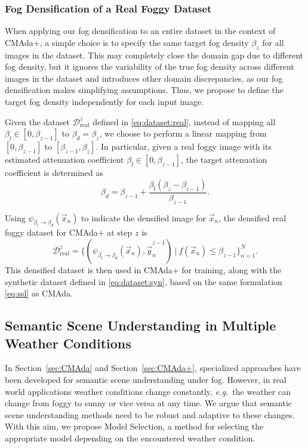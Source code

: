 \documentclass[twocolumn]{svjour3}          \smartqed  \usepackage{graphicx}
\newcommand{\eg}{\mbox{\emph{e.g.\ }}}
\begin{document}
\subsubsection{Fog Densification of a Real Foggy Dataset}
\label{sec:fog:densification:dataset}
When applying our fog densification to an entire dataset in the context of CMAda+, a simple choice is to specify the same target fog density $\beta_z$ for all images in the dataset. This may completely close the domain gap due to different fog density, but it ignores the variability of the true fog density across different images in the dataset and introduces other domain discrepancies, as our fog densification makes simplifying assumptions. Thus, we propose to define the target fog density independently for each input image.

Given the dataset $\mathcal{D}_{\text{real}}^z$ defined in \eqref{eq:dataset:real}, instead of mapping all $\beta_l \in [0, \beta_{z-1}]$ to $\beta_d = \beta_z$, we choose to perform a linear mapping from $[0, \beta_{z-1}]$  to $[\beta_{z-1}, \beta_{z}]$. In particular, given a real foggy image with its estimated attenuation coefficient $\beta_l \in [0, \beta_{z-1}]$, the target attenuation coefficient is determined as 
\begin{equation}
    \beta_d=\beta_{z-1}+\frac{\beta_l (\beta_z-\beta_{z-1})}{\beta_{z-1}}.
\end{equation}

Using $\psi_{\beta_l \rightarrow \beta_d}(\vec{x}_n)$ to indicate the densified image for $\vec{x}_n$, the densified real foggy dataset for CMAda+ at step $z$ is 
\begin{equation}
    \label{eq:dataset:real+}
    \mathcal{D}_{\text{real}}^z=\{(\psi_{\beta_l \rightarrow \beta_d}(\vec{x}_n), \hat{\vec{y}}_n^{z-1}) \: | \: f(\vec{x}_n)  \leq \beta_{z-1}\}_{n=1}^N.
\end{equation}
This densified dataset is then used in CMAda+ for training, along with the synthetic dataset defined in \eqref{eq:dataset:syn}, based on the same formulation \eqref{eq:ssl} as CMAda.


\subsection{Semantic Scene Understanding in Multiple Weather Conditions} 
\label{sec:model:selection:fusion}
In Section~\ref{sec:CMAda} and Section~\ref{sec:CMAda+}, specialized approaches have been developed for semantic scene understanding under fog. However, in real world applications weather conditions change constantly, \eg{}the weather can change from foggy to sunny or vice versa at any time. We argue that semantic scene understanding methods need to be robust and adaptive to these changes. With this aim, we propose Model Selection, a method for selecting the appropriate model depending on the encountered weather condition.
\end{document}
